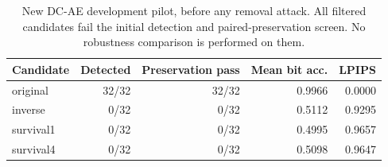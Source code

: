 \begin{table}[ht]\centering\small
\begin{tabular}{lrrrr}\toprule
Candidate & Detected & Preservation pass & Mean bit acc. & LPIPS\\\midrule
original & 32/32 & 32/32 & 0.9966 & 0.0000 \\
inverse & 0/32 & 0/32 & 0.5112 & 0.9295 \\
survival1 & 0/32 & 0/32 & 0.4995 & 0.9657 \\
survival4 & 0/32 & 0/32 & 0.5098 & 0.9647 \\
\bottomrule\end{tabular}
\caption{New DC-AE development pilot, before any removal attack. All filtered candidates fail the initial detection and paired-preservation screen. No robustness comparison is performed on them.}\end{table}
